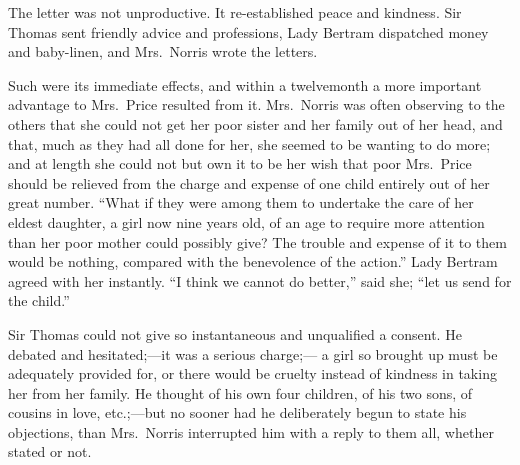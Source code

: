 \documentclass{article}
\begin{document}
The letter was not unproductive.  It re-established
peace and kindness.  Sir Thomas sent friendly
advice and professions, Lady Bertram dispatched
money and baby-linen, and Mrs.\ Norris wrote the letters.

Such were its immediate effects, and within a twelvemonth
a more important advantage to Mrs.\ Price resulted from it.
Mrs.\ Norris was often observing to the others that she
could not get her poor sister and her family out of
her head, and that, much as they had all done for her,
she seemed to be wanting to do more; and at length she
could not but own it to be her wish that poor Mrs.\ Price
should be relieved from the charge and expense of one child
entirely out of her great number.  ``What if they were
among them to undertake the care of her eldest daughter,
a girl now nine years old, of an age to require more
attention than her poor mother could possibly give?
The trouble and expense of it to them would be nothing,
compared with the benevolence of the action.''  Lady Bertram
agreed with her instantly.  ``I think we cannot do better,''
said she; ``let us send for the child.''

Sir Thomas could not give so instantaneous and unqualified
a consent.  He debated and hesitated;---it was a serious charge;---%
a girl so brought up must be adequately provided for,
or there would be cruelty instead of kindness in taking
her from her family.  He thought of his own four children,
of his two sons, of cousins in love, etc.;---but no sooner
had he deliberately begun to state his objections,
than Mrs.\ Norris interrupted him with a reply to them all,
whether stated or not.
\end{document}
